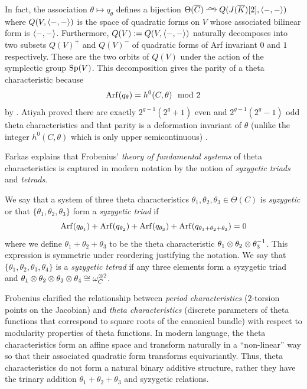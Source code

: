 \documentclass[main.tex]{subfiles}
\begin{document}
In fact, the association $\theta \mapsto q_{\theta}$ defines a bijection $\Theta(\ol{C}) \iso Q(J(\ol{K})[2], \inner{-}{-})$ where $Q(V, \left< -, - \right>)$ is the space of quadratic forms on $V$ whose associated bilinear form is $\left< -, - \right>$. Furthermore, $Q(V) := Q(V, \left< -, - \right>)$ naturally decomposes into two subsets $Q(V)^+$ and $Q(V)^{-}$ of quadratic forms of Arf invariant $0$ and $1$ respectively. These are the two orbits of $Q(V)$ under the action of the symplectic group $\operatorname{\mathrm{Sp}}(V)$. This decomposition gives the parity of a theta characteristic because
\[ \operatorname{\mathrm{Arf}}(q_{\theta}) = h^0(C, \theta) \mod 2 \]
by \cite[Theorem~4]{johnson:spin_structures}. Atiyah proved there are exactly $2^{g-1} (2^g + 1)$ even and $2^{g-1}(2^g - 1)$ odd theta characteristics and that parity is a deformation invariant of $\theta$ (unlike the integer $h^0(C, \theta)$ which is only upper semicontinuous) \cite{atiyah:spin_structures}. 
\par 
Farkas explains \cite{farkas:theta} that Frobenius' \textit{theory of fundamental systems} of theta characteristics is captured in modern notation by the notion of \textit{syzygetic triads} and \textit{tetrads}.

\begin{defn}
We say that a system of three theta characteristics $\theta_1, \theta_2, \theta_3 \in \Theta(C)$ is \textit{syzygetic} or that $\{ \theta_1, \theta_2, \theta_3 \}$ form a \textit{syzygetic triad} if
\[ \operatorname{\mathrm{Arf}}(q_{\theta_1}) + \operatorname{\mathrm{Arf}}(q_{\theta_2}) + \operatorname{\mathrm{Arf}}(q_{\theta_3}) + \operatorname{\mathrm{Arf}}(q_{\theta_1 + \theta_2 + \theta_3}) = 0 \]
where we define $\theta_1 + \theta_2 + \theta_3$ to be the theta characteristic $\theta_1 \otimes \theta_2 \otimes \theta_3^{-1}$. This expression is symmetric under reordering justifying the notation. We say that $\{ \theta_1, \theta_2, \theta_3, \theta_4 \}$ is a \textit{syzygetic tetrad} if any three elements form a syzygetic triad and $\theta_1 \otimes \theta_2 \otimes \theta_3 \otimes \theta_4 \cong \omega_C^{\otimes 2}$.
\end{defn} 

Frobenius clarified the relationship between \textit{period characteristics} ($2$-torsion points on the Jacobian) and \textit{theta characteristics} (discrete parameters of theta functions that correspond to square roots of the canonical bundle) with respect to modularity properties of theta functions. In modern language, the theta characteristics form an affine space and transform naturally in a ``non-linear'' way so that their associated quadratic form transforms equivariantly. Thus, theta characteristics do not form a natural binary additive structure, rather they have the trinary addition $\theta_1 + \theta_2 + \theta_3$ and syzygetic relations. 
\end{document}
